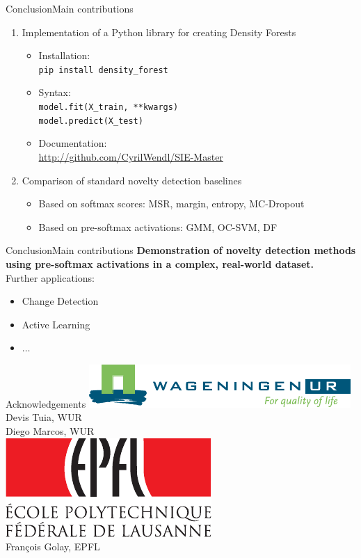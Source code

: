\documentclass{beamer}
\begin{document}
\begin{frame}{Conclusion}{Main contributions}
\begin{enumerate}
	\item Implementation of a Python library for creating Density Forests
	\begin{itemize}
		\item Installation:\\
		\texttt{pip install density\_forest}\pause
		\item Syntax:\\
		 \texttt{model.fit(X\_train, **kwargs)}\\ \texttt{model.predict(X\_test)}\pause\item Documentation:\\ \url{http://github.com/CyrilWendl/SIE-Master}\pause
	\end{itemize}
	\item Comparison of standard novelty detection baselines
	\begin{itemize}
		\item Based on softmax scores: \gls{MSR}, margin, entropy, \gls{MC-Dropout}
		\item Based on pre-softmax activations: \gls{GMM}, \gls{OC-SVM}, \gls{DF}
	\end{itemize}
\end{enumerate}
\end{frame}

\begin{frame}{Conclusion}{Main contributions}
	\textbf{Demonstration of novelty detection methods using pre-softmax activations in a complex, real-world dataset.} \\
	
	Further applications:
	\begin{itemize}
		\item Change Detection
		\item Active Learning
		\item $\dots$
	\end{itemize}
\end{frame}



\begin{frame}{Acknowledgements}
\centering\includegraphics[width=.4\textwidth]{logo_wur_quality_of_life}\\[.2cm]
Devis Tuia, WUR\\[.2cm]
Diego Marcos, WUR\\[.2cm]
\vfill
\includegraphics[width=.2\textwidth]{logo}\\[.2cm]
François Golay, EPFL
\end{frame}
\end{document}
